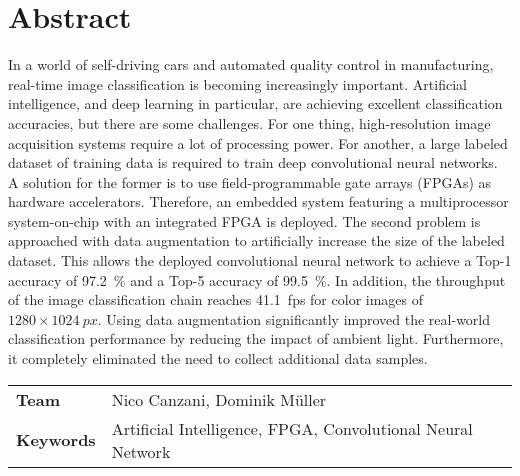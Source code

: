 \chapter*{Abstract}
In a world of self-driving cars and automated quality control in manufacturing, real-time image classification is becoming increasingly important.
Artificial intelligence, and deep learning in particular, are achieving excellent classification accuracies, but there are some challenges.
For one thing, high-resolution image acquisition systems require a lot of processing power.
For another, a large labeled dataset of training data is required to train deep convolutional neural networks.
A solution for the former is to use field-programmable gate arrays (FPGAs) as hardware accelerators.
Therefore, an embedded system featuring a multiprocessor system-on-chip with an integrated FPGA is deployed.
The second problem is approached with data augmentation to artificially increase the size of the labeled dataset.
This allows the deployed convolutional neural network to achieve a Top-1 accuracy of \SI{97.2}{\percent} and a Top-5 accuracy of \SI{99.5}{\percent}.
In addition, the throughput of the image classification chain reaches \SI{41.1}{fps} for color images of $1280\times\SI{1024}{px}$.
Using data augmentation significantly improved the real-world classification performance by reducing the impact of ambient light.
Furthermore, it completely eliminated the need to collect additional data samples.


\vspace{1cm}
\begin{tabular}{>{\bfseries}ll}
  Team  & Nico Canzani, Dominik M\"uller \\
  Keywords & Artificial Intelligence, FPGA, Convolutional Neural Network %
\end{tabular}
